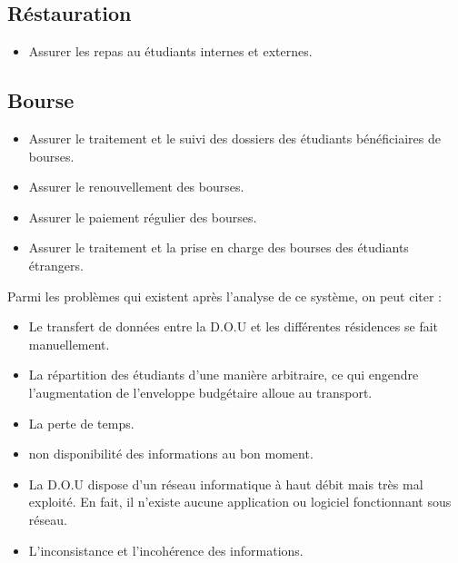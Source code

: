     \subsection*{Réstauration}
    \begin{itemize}
        \item Assurer les repas au étudiants internes et externes.
    \end{itemize}

    \subsection*{Bourse}
    \begin{itemize}
        \item Assurer le traitement et le suivi des dossiers des étudiants bénéficiaires de bourses.
        \item Assurer le renouvellement des bourses.
        \item Assurer le paiement régulier des bourses.
        \item Assurer le traitement et la prise en charge des bourses des étudiants étrangers.
    \end{itemize}

    Parmi les problèmes qui existent après l’analyse de ce système, on peut citer :
    \begin{itemize}
        \item Le transfert de données entre la D.O.U et les différentes résidences se fait manuellement.
        \item La répartition des étudiants d’une manière arbitraire, ce qui engendre l’augmentation de l’enveloppe budgétaire alloue au transport. 
        \item La perte de temps.
        \item non disponibilité des informations au bon moment.
        \item La D.O.U dispose d'un réseau informatique à haut débit mais très mal exploité. En fait, il n'existe aucune application ou logiciel fonctionnant sous réseau.
        \item L'inconsistance et l'incohérence des informations.
    \end{itemize}

